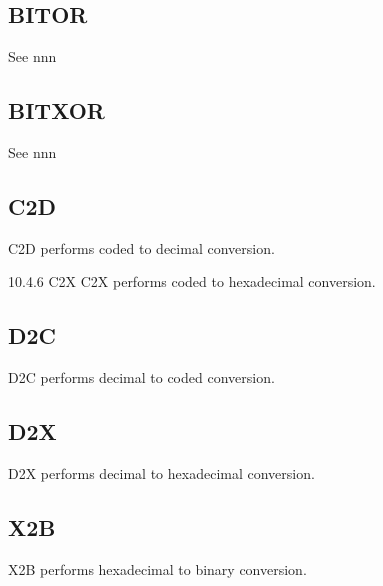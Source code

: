 

\subsection{BITOR}\label{bitor}

See nnn

\subsection{BITXOR}\label{bitxor}

See nnn

\subsection{C2D}\label{c2d}

C2D performs coded to decimal conversion.



10.4.6 C2X C2X performs coded to hexadecimal conversion.



\subsection{D2C}\label{d2c}

D2C performs decimal to coded conversion.



\subsection{D2X}\label{d2x}

D2X performs decimal to hexadecimal conversion.



\subsection{X2B}\label{x2b}

X2B performs hexadecimal to binary conversion.



